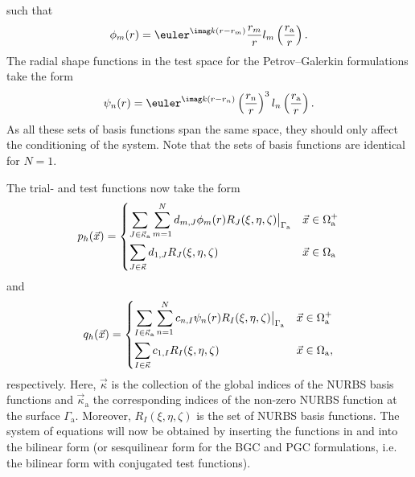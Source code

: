 such that
\begin{equation*}
	\phi_m(r) = \euler^{\imag k(r-r_m)}\frac{r_m}{r}l_m\left(\frac{r_{\mathrm{a}}}{r}\right).
\end{equation*}
The radial shape functions in the test space for the Petrov--Galerkin formulations take the form
\begin{equation*}
	\psi_n(r) = \euler^{\imag k(r-r_n)}\left(\frac{r_n}{r}\right)^3 l_n\left(\frac{r_{\mathrm{a}}}{r}\right).
\end{equation*}
As all these sets of basis functions span the same space, they should only affect the conditioning of the system. Note that the sets of basis functions are identical for $N=1$.

The trial- and test functions now take the form 
\begin{equation}\label{Eq2:p_h}
	p_h(\vec{x}) = \begin{dcases}
		\sum_{J\in\vec{\kappa}_{\mathrm{a}}} \sum_{m=1}^N d_{m,J}\phi_m(r) R_J(\xi,\eta,\zeta)\big|_{\Gamma_{\mathrm{a}}} & \vec{x}\in\Omega_{\mathrm{a}}^+\\
		\sum_{J\in\vec{\kappa}} d_{1,J} R_J(\xi,\eta,\zeta) & \vec{x}\in\Omega_{\mathrm{a}}
	\end{dcases}
\end{equation}
and
\begin{equation}\label{Eq2:q_h}
	q_h(\vec{x}) = \begin{dcases}
		\sum_{I\in\vec{\kappa}_{\mathrm{a}}} \sum_{n=1}^N c_{n,I}\psi_n(r) R_I(\xi,\eta,\zeta)\big|_{\Gamma_{\mathrm{a}}} & \vec{x}\in\Omega_{\mathrm{a}}^+\\
		\sum_{I\in\vec{\kappa}} c_{1,I} R_I(\xi,\eta,\zeta) & \vec{x}\in\Omega_{\mathrm{a}},
	\end{dcases}
\end{equation}
respectively. Here, $\vec{\kappa}$ is the collection of the global indices of the NURBS basis functions and $\vec{\kappa}_{\mathrm{a}}$ the corresponding indices of the non-zero NURBS function at the surface $\Gamma_{\mathrm{a}}$. Moreover, $R_I(\xi,\eta,\zeta)$ is the set of NURBS basis functions. The system of equations will now be obtained by inserting the functions in  and  into the bilinear form (or sesquilinear form for the BGC and PGC formulations, i.e. the bilinear form with conjugated test functions). 


